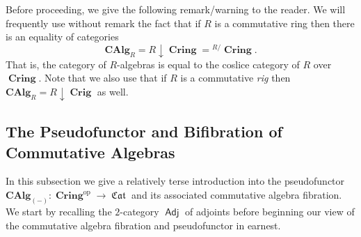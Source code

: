 \documentclass{amsart}
\theoremstyle{definition}
\DeclareMathOperator{\Crig}{\mathbf{Crig}}
\DeclareMathOperator{\Cring}{\mathbf{Cring}}
\DeclareMathOperator{\fCat}{\mathfrak{Cat}}
\DeclareMathOperator{\Adj}{\mathsf{Adj}}
\DeclareMathOperator{\op}{op}
\newcommand{\CAlg}[1]{\mathbf{CAlg}_{#1}}
\numberwithin{equation}{subsection}
\begin{document}
Before proceeding, we give the following remark/warning to the reader. We will frequently use without remark the fact that if $R$ is a commutative ring then there is an equality of categories 
\[\CAlg{R} = R \downarrow \Cring = {}^{R/}\Cring.
\]
That is, the category of $R$-algebras is equal to the coslice category of $R$ over $\Cring$. Note that we also use that if $R$ is a commutative \emph{rig} then $\CAlg{R} = R \downarrow \Crig$ as well.

\subsection{The Pseudofunctor and Bifibration of Commutative Algebras}\label{Subsection: Background Alg: Pseudofunctor of CAlg}
In this subsection we give a relatively terse introduction into the pseudofunctor $\CAlg{(-)}:\Cring^{\op} \to \fCat$ and its associated commutative algebra fibration. We start by recalling the $2$-category $\Adj$ of adjoints before beginning our view of the commutative algebra fibration and pseudofunctor in earnest.
\end{document}
